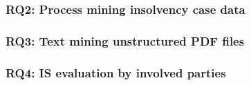 \begin{comment}
\paragraph{Third type}
A third type appeared: PDFs that were scanned and subsequently OCR-ed by a copier. They contain both text and images. The OCR quality is often poor. We retried re-OCR-ing the images with Tesseract which solved some errors but introduced others. Meta data about a.o. the scanner type was obtained which could improve post-process text extraction in future work.


\subsubsection{PDF report section and parameter extraction}
[todo]

\end{comment}

\subsubsection{RQ2: Process mining insolvency case data}
\subsubsection{RQ3: Text mining unstructured PDF files}
\subsubsection{RQ4: IS evaluation by involved parties}
